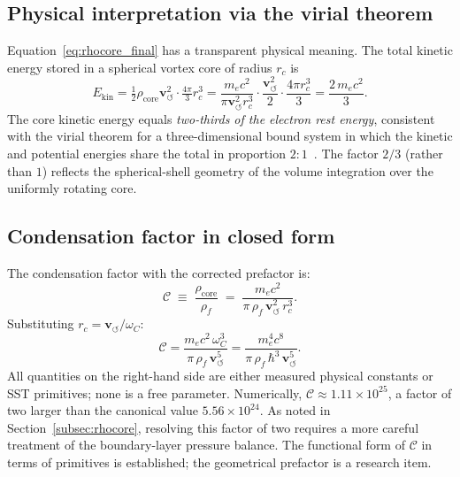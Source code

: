 \documentclass[11pt,a4paper]{article}
\newcommand{\rc}{r_c}
\newcommand{\vswirl}{\mathbf{v}_{\scriptscriptstyle\boldsymbol{\circlearrowleft}}}
\newcommand{\rhof}{\rho_{\!f}}
\newcommand{\rhocore}{\rho_{\!\mathrm{core}}}
\newcommand{\omC}{\omega_C}
\begin{document}
\subsection{Physical interpretation via the virial theorem}

Equation~\eqref{eq:rhocore_final} has a transparent physical meaning.
The total kinetic energy stored in a spherical vortex core of
radius $\rc$ is
\begin{equation}
  E_{\mathrm{kin}}
  = \tfrac{1}{2}\rhocore\vswirl^2 \cdot \tfrac{4\pi}{3}\rc^3
  = \frac{m_e c^2}{\pi\vswirl^2\rc^3}
    \cdot\frac{\vswirl^2}{2}\cdot\frac{4\pi\rc^3}{3}
  = \frac{2\,m_e c^2}{3}.
  \label{eq:Ekin_core}
\end{equation}
The core kinetic energy equals \emph{two-thirds of the electron
rest energy}, consistent with the virial theorem for a
three-dimensional bound system in which the kinetic and potential
energies share the total in proportion $2:1$~\cite{LandauMechanics}.
The factor $2/3$ (rather than $1$) reflects the spherical-shell
geometry of the volume integration over the uniformly rotating core.

\subsection{Condensation factor in closed form}

The condensation factor with the corrected prefactor is:
\begin{equation}
  \mathcal{C}
  \;\equiv\; \frac{\rhocore}{\rhof}
  \;=\; \frac{m_e c^2}{\pi\,\rhof\,\vswirl^2\,\rc^3}.
  \label{eq:C_closed}
\end{equation}
Substituting $\rc=\vswirl/\omC$:
\begin{equation}
  \mathcal{C}
  = \frac{m_e c^2\,\omC^3}{\pi\,\rhof\,\vswirl^5}
  = \frac{m_e^4 c^8}{\pi\,\rhof\,\hbar^3\,\vswirl^5}.
  \label{eq:C_primitives}
\end{equation}
All quantities on the right-hand side are either measured physical
constants or SST primitives; none is a free parameter.
Numerically, $\mathcal{C}\approx1.11\times10^{25}$, a factor of two
larger than the canonical value $5.56\times10^{24}$.  As noted in
Section~\ref{subsec:rhocore}, resolving this factor of two requires
a more careful treatment of the boundary-layer pressure balance.
The functional form of $\mathcal{C}$ in terms of primitives is
established; the geometrical prefactor is a research item.

\end{document}
